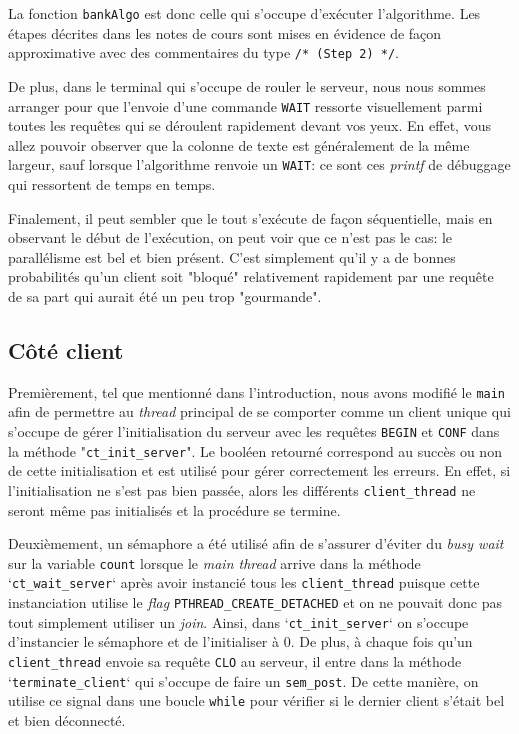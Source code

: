 \documentclass[11pt]{article}
\begin{document}
La fonction \texttt{bankAlgo} est donc celle qui s'occupe d'exécuter l'algorithme. Les étapes décrites dans les notes de cours sont mises en évidence de façon approximative avec des commentaires du type \texttt{/* (Step 2) */}.

De plus, dans le terminal qui s'occupe de rouler le serveur, nous nous sommes arranger pour que l'envoie d'une commande \texttt{WAIT} ressorte visuellement parmi toutes les requêtes qui se déroulent rapidement devant vos yeux. En effet, vous allez pouvoir observer que la colonne de texte est généralement de la même largeur, sauf lorsque l'algorithme renvoie un \texttt{WAIT}: ce sont ces \textit{printf} de débuggage qui ressortent de temps en temps.

Finalement, il peut sembler que le tout s'exécute de façon séquentielle, mais en observant le début de l'exécution, on peut voir que ce n'est pas le cas: le parallélisme est bel et bien présent. C'est simplement qu'il y a de bonnes probabilités qu'un client soit "bloqué" relativement rapidement par une requête de sa part qui aurait été un peu trop "gourmande".


\subsection{Côté client}

Premièrement, tel que mentionné dans l'introduction, nous avons modifié le \texttt{main} afin de permettre au \textit{thread} principal de se comporter comme un client unique qui s'occupe de gérer l'initialisation du serveur avec les requêtes \texttt{BEGIN} et \texttt{CONF} dans la méthode "\texttt{ct\_init\_server}". Le booléen retourné correspond au succès ou non de cette initialisation et est utilisé pour gérer correctement les erreurs. En effet, si l'initialisation ne s'est pas bien passée, alors les différents \texttt{client\_thread} ne seront même pas initialisés et la procédure se termine.

Deuxièmement, un sémaphore a été utilisé afin de s'assurer d'éviter du \textit{busy wait} sur la variable \texttt{count} lorsque le \textit{main thread} arrive dans la méthode `\texttt{ct\_wait\_server}` après avoir instancié tous les \texttt{client\_thread} puisque cette instanciation utilise le \textit{flag} \texttt{PTHREAD\_CREATE\_DETACHED} et on ne pouvait donc pas tout simplement utiliser un \textit{join}. Ainsi, dans `\texttt{ct\_init\_server}` on s'occupe d'instancier le sémaphore et de l'initialiser à 0. De plus, à chaque fois qu'un \texttt{client\_thread} envoie sa requête \texttt{CLO} au serveur, il entre dans la méthode `\texttt{terminate\_client}` qui s'occupe de faire un \texttt{sem\_post}. De cette manière, on utilise ce signal dans une boucle \texttt{while} pour vérifier si le dernier client s'était bel et bien déconnecté.
\end{document}
